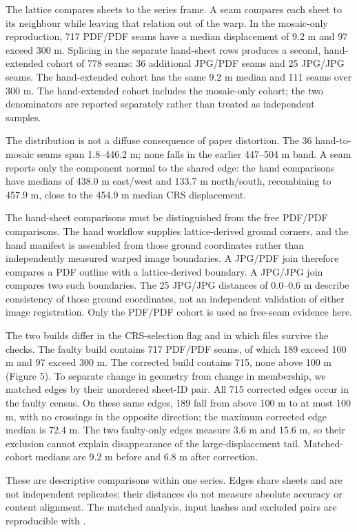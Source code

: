 \documentclass[11pt,a4paper]{article}
\begin{document}
The lattice compares sheets to the series frame. A seam compares each sheet to its neighbour while leaving that relation out of the warp. In the mosaic-only reproduction, 717 PDF/PDF seams have a median displacement of 9.2 m and 97 exceed 300 m. Splicing in the separate hand-sheet rows produces a second, hand-extended cohort of 778 seams: 36 additional JPG/PDF seams and 25 JPG/JPG seams. The hand-extended cohort has the same 9.2 m median and 111 seams over 300 m. The hand-extended cohort includes the mosaic-only cohort; the two denominators are reported separately rather than treated as independent samples.

The distribution is not a diffuse consequence of paper distortion. The 36 hand-to-mosaic seams span 1.8–446.2 m; none falls in the earlier 447–504 m band. A seam reports only the component normal to the shared edge: the hand comparisons have medians of 438.0 m east/west and 133.7 m north/south, recombining to 457.9 m, close to the 454.9 m median CRS displacement.

The hand-sheet comparisons must be distinguished from the free PDF/PDF comparisons. The hand workflow supplies lattice-derived ground corners, and the hand manifest is assembled from those ground coordinates rather than independently measured warped image boundaries. A JPG/PDF join therefore compares a PDF outline with a lattice-derived boundary. A JPG/JPG join compares two such boundaries. The 25 JPG/JPG distances of 0.0–0.6 m describe consistency of those ground coordinates, not an independent validation of either image registration. Only the PDF/PDF cohort is used as free-seam evidence here.

The two builds differ in the CRS-selection flag and in which files survive the checks. The faulty build contains 717 PDF/PDF seams, of which 189 exceed 100 m and 97 exceed 300 m. The corrected build contains 715, none above 100 m (Figure 5). To separate change in geometry from change in membership, we matched edges by their unordered sheet-ID pair. All 715 corrected edges occur in the faulty census. On these same edges, 189 fall from above 100 m to at most 100 m, with no crossings in the opposite direction; the maximum corrected edge median is 72.4 m. The two faulty-only edges measure 3.6 m and 15.6 m, so their exclusion cannot explain disappearance of the large-displacement tail. Matched-cohort medians are 9.2 m before and 6.8 m after correction.

These are descriptive comparisons within one series. Edges share sheets and are not independent replicates; their distances do not measure absolute accuracy or content alignment. The matched analysis, input hashes and excluded pairs are reproducible with \texttt{}.
\end{document}
